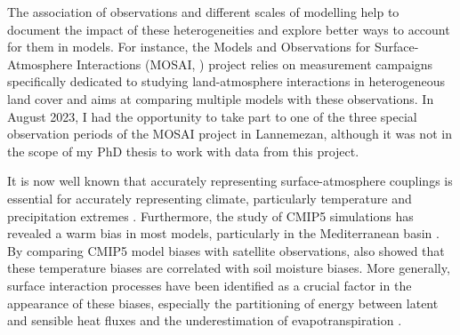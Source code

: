 The association of observations and different scales of modelling help to document the impact of these heterogeneities and explore better ways to account for them in models. For instance, the  Models and Observations for Surface-Atmosphere Interactions (MOSAI, \cite{lohou_model_2025}) project relies on measurement campaigns specifically dedicated to studying land-atmosphere interactions in heterogeneous land cover and aims at comparing multiple models with these observations. In August 2023, I had the opportunity to take part to one of the three special observation periods of the MOSAI project in Lannemezan, although it was not in the scope of my PhD thesis to work with data from this project.

\hfill

It is now well known that accurately representing surface-atmosphere couplings is essential for accurately representing climate, particularly temperature and precipitation extremes \citep{jaeger_impact_2011, van_den_hurk_acceleration_2011}. Furthermore, the study of CMIP5 simulations has revealed a warm bias in most models, particularly in the Mediterranean basin \citep{christensen_temperature_2012, mueller_systematic_2014}. By comparing CMIP5 model biases with satellite observations, \citet{al-yaari_satellite-based_2019} also showed that these temperature biases are correlated with soil moisture biases. More generally, surface interaction processes have been identified as a crucial factor in the appearance of these biases, especially the partitioning of energy between latent and sensible heat fluxes and the underestimation of evapotranspiration \citep{cheruy_combined_2013, cheruy_role_2014,williams_land-atmosphere_2016,ma_causes_2018}. 

